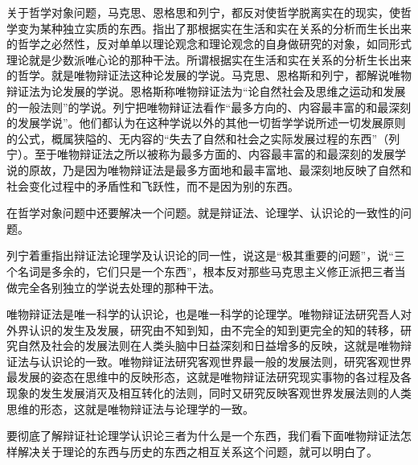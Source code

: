 关于哲学对象问题，马克思、恩格思和列宁，都反对使哲学脱离实在的现实，使哲学变为某种独立实质的东西。指出了那根据实在生活和实在关系的分析而生长出来的哲学之必然性，反对单单以理论观念和理论观念的自身做研究的对象，如同形式理论就是少数派唯心论的那种干法。所谓根据实在生活和实在关系的分析生长出来的哲学。就是唯物辩证法这种论发展的学说。马克思、恩格斯和列宁，都解说唯物辩证法为论发展的学说。恩格斯称唯物辩证法为“论自然社会及思维之运动和发展的一般法则”的学说。列宁把唯物辩证法看作“最多方向的、内容最丰富的和最深刻的发展学说”。他们都认为在这种学说以外的其他一切哲学学说所述一切发展原则的公式，概属狭隘的、无内容的“失去了自然和社会之实际发展过程的东西”（列宁）。至于唯物辩证法之所以被称为最多方面的、内容最丰富的和最深刻的发展学说的原故，乃是因为唯物辩证法是最多方面地和最丰富地、最深刻地反映了自然和社会变化过程中的矛盾性和飞跃性，而不是因为别的东西。

在哲学对象问题中还要解决一个问题。就是辩证法、论理学、认识论的一致性的问题。

列宁着重指出辩证法论理学及认识论的同一性，说这是“极其重要的问题”，说“三个名词是多余的，它们只是一个东西”，根本反对那些马克思主义修正派把三者当做完全各别独立的学说去处理的那种干法。

唯物辩证法是唯一科学的认识论，也是唯一科学的论理学。唯物辩证法研究吾人对外界认识的发生及发展，研究由不知到知，由不完全的知到更完全的知的转移，研究自然及社会的发展法则在人类头脑中日益深刻和日益增多的反映，这就是唯物辩证法与认识论的一致。唯物辩证法研究客观世界最一般的发展法则，研究客观世界最发展的姿态在思维中的反映形态，这就是唯物辩证法研究现实事物的各过程及各现象的发生发展消灭及相互转化的法则，同时又研究反映客观世界发展法则的人类思维的形态，这就是唯物辩证法与论理学的一致。

要彻底了解辩证社论理学认识论三者为什么是一个东西，我们看下面唯物辩证法怎样解决关于理论的东西与历史的东西之相互关系这个问题，就可以明白了。

